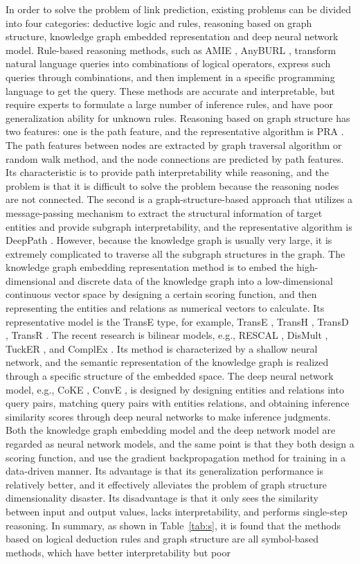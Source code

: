 \documentclass[10pt,journal,compsoc]{IEEEtran}
\begin{document}
In order to solve the problem of link prediction, existing problems can be divided into four categories: deductive logic and rules, reasoning based on graph structure, knowledge graph embedded representation and deep neural network model. Rule-based reasoning methods, such as AMIE \cite{ref3}, AnyBURL \cite{ref4}, transform natural language queries into combinations of logical operators, express such queries through combinations, and then implement in a specific programming language to get the query. These methods are accurate and interpretable, but require experts to formulate a large number of inference rules, and have poor generalization ability for unknown rules. Reasoning based on graph structure has two features: one is the path feature, and the representative algorithm is PRA \cite{ref33}. The path features between nodes are extracted by graph traversal algorithm or random walk method, and the node connections are predicted by path features. Its characteristic is to provide path interpretability while reasoning, and the problem is that it is difficult to solve the problem because the reasoning nodes are not connected. The second is a graph-structure-based approach that utilizes a message-passing mechanism to extract the structural information of target entities and provide subgraph interpretability, and the representative algorithm is DeepPath \cite{ref8}. However, because the knowledge graph is usually very large, it is extremely complicated to traverse all the subgraph structures in the graph. The knowledge graph embedding representation method is to embed the high-dimensional and discrete data of the knowledge graph into a low-dimensional continuous vector space by designing a certain scoring function, and then representing the entities and relations as numerical vectors to calculate. Its representative model is the TransE type, for example, TransE \cite{ref1}, TransH \cite{ref5}, TransD \cite{ref66}, TransR \cite{ref6}. The recent research is bilinear models, e.g., RESCAL \cite{ref21}, DisMult \cite{ref22}, TuckER \cite{ref7}, and ComplEx \cite{ref16}. Its method is characterized by a shallow neural network, and the semantic representation of the knowledge graph is realized through a specific structure of the embedded space. The deep neural network model, e.g., CoKE \cite{ref63}, ConvE \cite{ref23}, is designed by designing entities and relations into query pairs, matching query pairs with entities relations, and obtaining inference similarity scores through deep neural networks to make inference judgments. Both the knowledge graph embedding model and the deep network model are regarded as neural network models, and the same point is that they both design a scoring function, and use the gradient backpropagation method for training in a data-driven manner. Its advantage is that its generalization performance is relatively better, and it effectively alleviates the problem of graph structure dimensionality disaster. Its disadvantage is that it only sees the similarity between input and output values, lacks interpretability, and performs single-step reasoning. In summary, as shown in Table~\ref{tab:s}, it is found that the methods based on logical deduction rules and graph structure are all symbol-based methods, which have better interpretability but poor 
\end{document}
